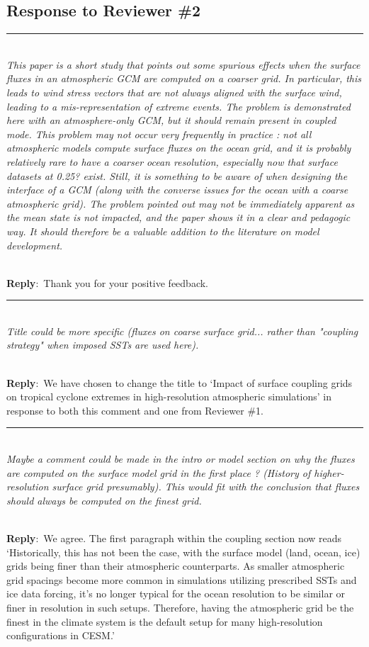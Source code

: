 \documentclass{article}
\newcommand{\genDisc}[1]{\medskip \hrule \noindent \\
               {\itshape #1}}
\newcommand{\reply}{\noindent \\ \textbf{Reply}:\ }
\begin{document}
\subsection*{Response to Reviewer \#2}

\genDisc{This paper is a short study that points out some spurious effects when the surface fluxes in an atmospheric GCM are computed on a coarser grid. In particular, this leads to wind stress vectors that are not always aligned with the surface wind, leading to a mis-representation of extreme events. The problem is demonstrated here with an atmosphere-only GCM, but it should remain present in coupled mode. This problem may not occur very frequently in practice : not all atmospheric models compute surface fluxes on the ocean grid, and it is probably relatively rare to have a coarser ocean resolution, especially now that surface datasets at 0.25? exist. Still, it is something to be aware of when designing the interface of a GCM (along with the converse issues for the ocean with a coarse atmospheric grid). The problem pointed out may not be immediately apparent as the mean state is not impacted, and the paper shows it in a clear and pedagogic way. It should therefore be a valuable addition to the literature on model development.}

\reply{Thank you for your positive feedback.}

\genDisc{Title could be more specific (fluxes on coarse surface grid... rather than "coupling strategy" when imposed SSTs are used here).}

\reply{We have chosen to change the title to `Impact of surface coupling grids on tropical cyclone extremes in high-resolution atmospheric simulations' in response to both this comment and one from Reviewer \#1.}

\genDisc{Maybe a comment could be made in the intro or model section on why the fluxes are computed on the surface model grid in the first place ? (History of higher-resolution surface grid presumably). This would fit with the conclusion that fluxes should always be computed on the finest grid.}

\reply{We agree. The first paragraph within the coupling section now reads `Historically, this has not been the case, with the surface model (land, ocean, ice) grids being finer than their atmospheric counterparts. As smaller atmospheric grid spacings become more common in simulations utilizing prescribed SSTs and ice data forcing, it's no longer typical for the ocean resolution to be similar or finer in resolution in such setups. Therefore, having the atmospheric grid be the finest in the climate system is the default setup for many high-resolution configurations in CESM.'}
\end{document}
